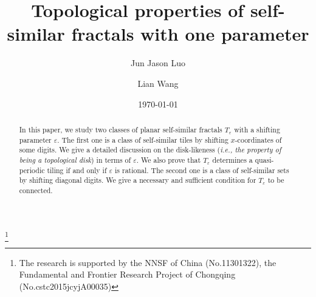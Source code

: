\documentclass[12pt, reqno]{amsart}
\numberwithin{equation}{section}
\begin{document}
\title{Topological properties of self-similar fractals with one parameter}


\author{Jun Jason Luo} 
\address{College of Mathematics and Statistics, Chongqing University,  401331 Chongqing, China
	\newline\indent Institut f\"ur Mathematik, Friedrich-Schiller-Universit\"at Jena, 07743 Jena, Germany}

\author{Lian Wang} \address{College of Mathematics and Statistics,  Chongqing Uinversity, Chongqing, 401331, P.R. China} 







\thanks{The research is supported by the NNSF of China (No.11301322), the Fundamental and Frontier Research Project of Chongqing (No.cstc2015jcyjA00035)}

\date{\today}

\begin{abstract}
 In this paper, we study two classes of planar self-similar fractals $T_\varepsilon$ with a shifting  parameter $\varepsilon$. The first one is a class of self-similar tiles by shifting $x$-coordinates of some digits. We give a detailed discussion on the disk-likeness ({\it i.e., the property of being a topological disk}) in terms of $\varepsilon$. We also prove that $T_\varepsilon$ determines a quasi-periodic tiling if and only if $\varepsilon$ is rational. The second one is a class of self-similar sets by shifting diagonal digits. We give a necessary and sufficient condition for $T_\varepsilon$ to be connected.
\end{abstract}

\maketitle
\end{document}
